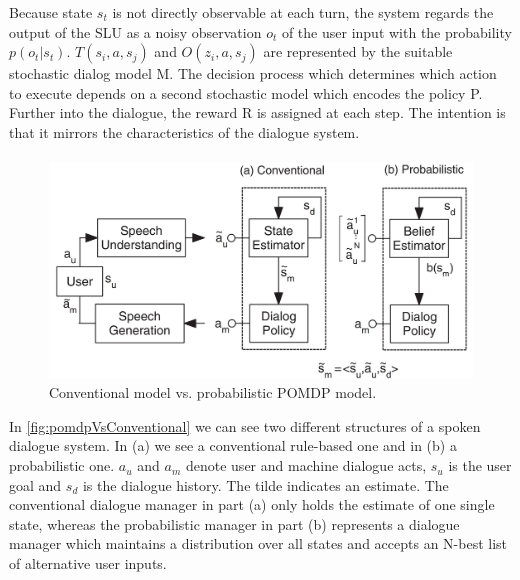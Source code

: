 \documentclass[conference]{IEEEtran}
\begin{document}
Because state $s_{t}$ is not directly observable at each turn, the system regards the output of the SLU as a noisy observation $o_{t}$ of the user input with the probability $p(o_{t}|s_{t})$. $T(s_{i},a,s_{j})$ and $O(z_{i},a,s_{j})$ are represented by the suitable stochastic dialog model M. The decision process which determines which action to execute depends on a second stochastic model which encodes the policy P. Further into the dialogue, the reward R is assigned at each step. The intention is that it mirrors the characteristics of the dialogue system\cite{young2013pomdp}.

\paragraph{}


\begin{figure}[H]
\centering
   \includegraphics[width=\linewidth]{probabilisticVsConventionalModel.jpg}
  \caption{Conventional model vs. probabilistic POMDP model\cite{young2010hidden}.}
  \label{fig:pomdpVsConventional}
\end{figure}

In \autoref{fig:pomdpVsConventional} we can see two different structures of a spoken dialogue system. In (a) we see a conventional rule-based one and in (b) a probabilistic one. $a_{u}$ and $a_{m}$ denote user and machine dialogue acts, $s_{u}$ is the user goal and $s_{d}$ is the dialogue history. The tilde indicates an estimate.
The conventional dialogue manager in part (a) only holds the estimate of one single state, whereas the probabilistic manager in part (b) represents a dialogue manager which maintains a distribution over all states and accepts an N-best list of alternative user inputs\cite{young2010hidden}.  
\end{document}
